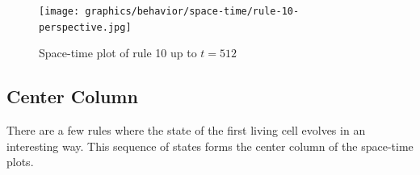 \documentclass{article}
\begin{document}
\vspace{1cm}

\begin{figure}[H]
    \centering
    \texttt{[image: graphics/behavior/space-time/rule-10-perspective.jpg]}
    \caption{Space-time plot of rule 10 up to $t=512$}
    \label{fig:rule-10-perspective}
\end{figure}





\pagebreak
\subsection{Center Column} \label{center-column}
\noindent There are a few rules where the state of the first living cell evolves in an interesting way. This sequence of states forms the center column of the space-time plots.
\vspace{40pt}
\end{document}
